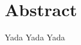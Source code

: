 \documentclass[main.tex]{subfiles}
\begin{document}
\setcounter{page}{1}
\chapter*{Abstract}
Yada Yada Yada %
\end{document}
